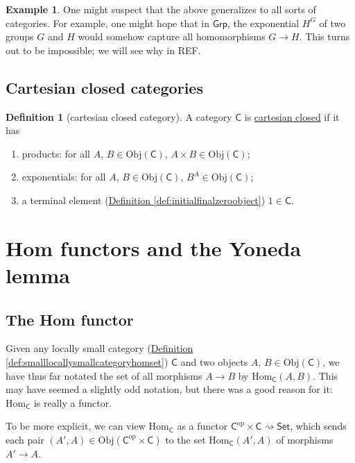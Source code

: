 \documentclass[a4paper]{report}
\newcommand{\defn}[1]{\ul{#1}}
\newcommand{\Obj}{\mathrm{Obj}}
\newcommand{\Hom}{\mathrm{Hom}}
\theoremstyle{definition}
\newtheorem{definition}{Definition}[section]
\newtheorem{example}{Example}[section]
\theoremstyle{plain}
\theoremstyle{remark}
\begin{document}
\begin{example}
  One might suspect that the above generalizes to all sorts of categories. For example, one might hope that in $\mathsf{Grp}$, the exponential $H^{G}$ of two groups $G$ and $H$ would somehow capture all homomorphisms $G \to H$. This turns out to be impossible; we will see why in REF.
\end{example}

\subsection{Cartesian closed categories}
\begin{definition}[cartesian closed category]
  \label{def:cartesianclosedcategory}
  A category $\mathsf{C}$ is \defn{cartesian closed} if it has
  \begin{enumerate}
    \item products: for all $A$, $B \in \Obj(\mathsf{C})$, $A \times B \in \Obj(\mathsf{C})$;
    \item exponentials: for all $A$, $B \in \Obj(\mathsf{C})$, $B^{A} \in \Obj(\mathsf{C})$;
    \item a terminal element (\hyperref[def:initialfinalzeroobject]{Definition \ref*{def:initialfinalzeroobject}}) $1 \in \mathsf{C}$.
  \end{enumerate}
\end{definition}

\section{Hom functors and the Yoneda lemma} \label{sec:homfunctorsandyoneda}
\subsection{The Hom functor} \label{section:homfunctor}
Given any locally small category (\hyperref[def:smalllocallysmallcategoryhomset]{Definition \ref*{def:smalllocallysmallcategoryhomset}}) $\mathsf{C}$ and two objects $A$, $B \in \Obj(\mathsf{C})$, we have thus far notated the set of all morphisms $A \to B$ by $\Hom_{\mathsf{C}}(A, B)$. This may have seemed a slightly odd notation, but there was a good reason for it: $\Hom_{\mathsf{C}}$ is really a functor.

To be more explicit, we can view $\Hom_{\mathsf{C}}$ as a functor $\mathsf{C}^{\mathrm{op}} \times \mathsf{C} \rightsquigarrow \mathsf{Set}$, which sends each pair $(A', A) \in \Obj(\mathsf{C}^{\mathrm{op}} \times \mathsf{C})$ to the set $\Hom_{\mathsf{C}}(A', A)$ of morphisms $A' \to A$. 
\end{document}

